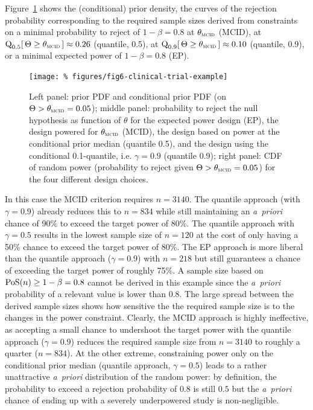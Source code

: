 \documentclass{article}
\begin{document}
Figure~\ref{fig:example} shows the (conditional) prior density, the curves of the rejection probability corresponding to the required sample sizes derived from constraints on a minimal probability to reject of $1-\beta=0.8$ at $\mcid$ (MCID), at ${\quant{0.5}[\,\Theta\geq\mcid\,]\approx0.26}$ (quantile, 0.5), at ${\quant{0.9}[\,\Theta\geq\mcid\,]\approx0.10}$ (quantile, 0.9), or a minimal expected power of $1-\beta=0.8$ (EP).
\begin{figure}
    \centering
    \texttt{[image: \%
        figures/fig6-clinical-trial-example]}
    \caption{Left panel: prior PDF and conditional prior PDF (on $\Theta>\mcid = 0.05$); middle panel: probability to reject the null hypothesis as function of $\theta$ for the expected power design (EP), the design powered for $\mcid$ (MCID), the design based on power at the conditional prior median (quantile 0.5),
    and the design using the conditional 0.1-quantile, i.e. $\gamma=0.9$ (quantile 0.9); right panel: CDF of random power (probability to reject given $\Theta>\mcid = 0.05$) for the four different design choices.}
    \label{fig:example}
\end{figure}

In this case the MCID criterion requires $n=3140$.
The quantile approach (with $\gamma=0.9$) already reduces this to $n=834$ while still maintaining an \textit{a~priori} chance of 90\% to exceed the target power of 80\%.
The quantile approach with $\gamma=0.5$ results in the lowest sample size of $n=120$ at the cost of only having a 50\% chance to exceed the target power of 80\%.
The EP approach is more liberal than the quantile approach ($\gamma=0.9$) with $n=218$ but still guarantees a chance of exceeding the target power of roughly 75\%.
A sample size based on $\operatorname{PoS}(n)\geq1-\beta=0.8$ cannot be derived in this example since the \textit{a~priori} probability of a relevant value is lower than $0.8$.
The large spread between the derived sample sizes shows how sensitive the
the required sample size is to the changes in the power constraint.
Clearly, the MCID approach is highly ineffective, as accepting a small chance to undershoot the target power with the quantile approach ($\gamma=0.9$) reduces the required sample size from $n=3140$ to roughly a quarter ($n=834$).
At the other extreme, constraining power only on the conditional prior median (quantile approach, $\gamma=0.5$) leads to a rather unattractive \textit{a~priori} distribution of the random power:
by definition, the probability to exceed a rejection probability of $0.8$ is still $0.5$ but the \textit{a~priori} chance of ending up with a severely underpowered study is non-negligible.
\end{document}
